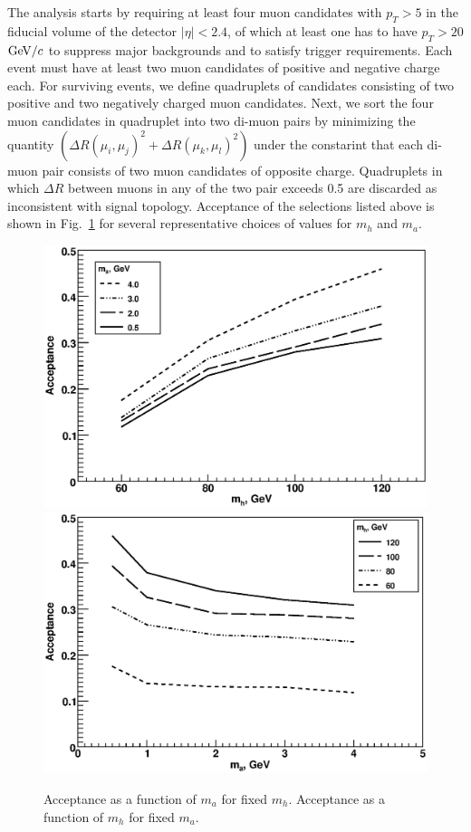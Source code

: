 \documentclass[aps,prl,twocolumn,nofootinbib,superscriptaddress]{revtex4}
\begin{document}
{The analysis starts by requiring at least four muon candidates with $p_T>5$ \gevc in the fiducial 
volume of the detector $|\eta|<2.4$, of which at least one has to have $p_T>20$ $\mbox{${\rm GeV}/c$}$ to suppress 
major backgrounds and to satisfy trigger requirements. Each event must have at least two muon 
candidates of positive and negative charge each. For surviving events, we define quadruplets of 
candidates consisting of two positive and two negatively charged muon candidates. Next, we sort the 
four muon candidates in quadruplet into two di-muon pairs by minimizing the quantity 
$(\Delta R(\mu_i,\mu_j)^2 + \Delta R (\mu_k,\mu_l)^2)$ under the constarint that each di-muon pair
consists of two muon candidates of opposite charge. Quadruplets in which $\Delta R$ between 
muons in any of the two pair exceeds 0.5 are discarded as inconsistent with signal topology. 
Acceptance of the selections listed above is shown in Fig.~\ref{signal_acceptance} for several
representative choices of values for $m_h$ and $m_a$. 

\begin{figure}[htbp]
\begin{center}
\includegraphics[width=0.48\linewidth]{plots/acceptance_vs_mh.eps}
\includegraphics[width=0.48\linewidth]{plots/acceptance_vs_ma.eps}
\caption{Acceptance as a function of $m_a$ for fixed $m_h$. Acceptance as a function of $m_h$ for fixed $m_a$.}
\label{signal_acceptance}
\end{center}
\end{figure}


}
\end{document}

